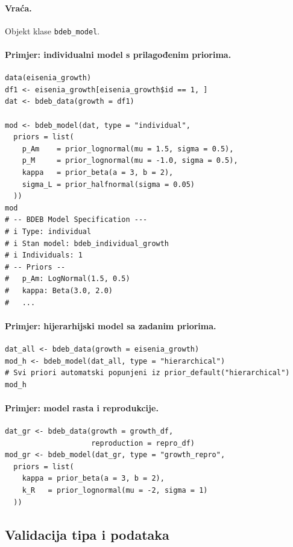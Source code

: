 \documentclass[11pt,a4paper]{article}
\newcommand{\code}[1]{\texttt{#1}}
\begin{document}
\paragraph{Vraća.} Objekt klase \code{bdeb\_model}.

\paragraph{Primjer: individualni model s prilagođenim priorima.}
\begin{lstlisting}
data(eisenia_growth)
df1 <- eisenia_growth[eisenia_growth$id == 1, ]
dat <- bdeb_data(growth = df1)

mod <- bdeb_model(dat, type = "individual",
  priors = list(
    p_Am    = prior_lognormal(mu = 1.5, sigma = 0.5),
    p_M     = prior_lognormal(mu = -1.0, sigma = 0.5),
    kappa   = prior_beta(a = 3, b = 2),
    sigma_L = prior_halfnormal(sigma = 0.05)
  ))
mod
# -- BDEB Model Specification ---
# i Type: individual
# i Stan model: bdeb_individual_growth
# i Individuals: 1
# -- Priors --
#   p_Am: LogNormal(1.5, 0.5)
#   kappa: Beta(3.0, 2.0)
#   ...
\end{lstlisting}

\paragraph{Primjer: hijerarhijski model sa zadanim priorima.}
\begin{lstlisting}
dat_all <- bdeb_data(growth = eisenia_growth)
mod_h <- bdeb_model(dat_all, type = "hierarchical")
# Svi priori automatski popunjeni iz prior_default("hierarchical")
mod_h
\end{lstlisting}

\paragraph{Primjer: model rasta i reprodukcije.}
\begin{lstlisting}
dat_gr <- bdeb_data(growth = growth_df,
                    reproduction = repro_df)
mod_gr <- bdeb_model(dat_gr, type = "growth_repro",
  priors = list(
    kappa = prior_beta(a = 3, b = 2),
    k_R   = prior_lognormal(mu = -2, sigma = 1)
  ))
\end{lstlisting}

\subsection{Validacija tipa i podataka}
\end{document}
